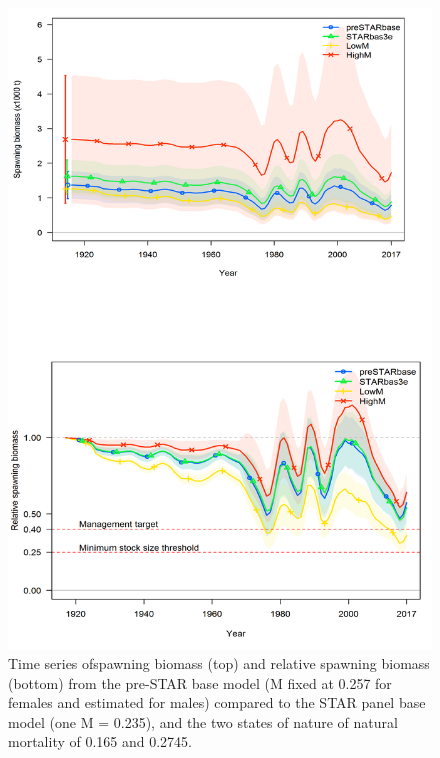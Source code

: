 \documentclass[12pt,]{article}
\begin{document}
\begin{figure}[htbp]
\centering
\includegraphics{Figures/Request12.png}
\caption{Time series ofspawning biomass (top) and relative spawning
biomass (bottom) from the pre-STAR base model (M fixed at 0.257 for
females and estimated for males) compared to the STAR panel base model
(one M = 0.235), and the two states of nature of natural mortality of
0.165 and 0.2745. \label{fig:Request12}}
\end{figure}

\FloatBarrier

\FloatBarrier

\FloatBarrier
\end{document}
